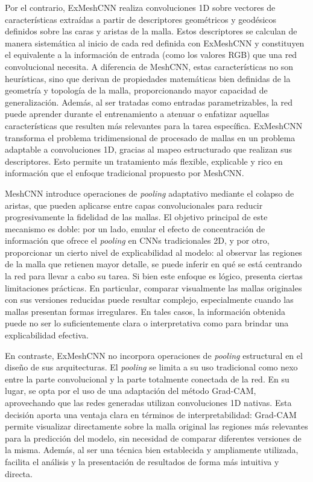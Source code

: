 Por el contrario, ExMeshCNN realiza convoluciones 1D sobre vectores de características extraídas a partir de descriptores geométricos y geodésicos definidos sobre las caras y aristas de la malla. Estos descriptores se calculan de manera sistemática al inicio de cada red definida con ExMeshCNN y constituyen el equivalente a la información de entrada (como los valores RGB) que una red convolucional necesita. A diferencia de MeshCNN, estas características no son heurísticas, sino que derivan de propiedades matemáticas bien definidas de la geometría y topología de la malla, proporcionando mayor capacidad de generalización. Además, al ser tratadas como entradas parametrizables, la red puede aprender durante el entrenamiento a atenuar o enfatizar aquellas características que resulten más relevantes para la tarea específica. ExMeshCNN transforma el problema tridimensional de procesado de mallas en un problema adaptable a convoluciones 1D, gracias al mapeo estructurado que realizan sus descriptores. Esto permite un tratamiento más flexible, explicable y rico en información que el enfoque tradicional propuesto por MeshCNN.

MeshCNN introduce operaciones de \textit{pooling} adaptativo mediante el colapso de aristas, que pueden aplicarse entre capas convolucionales para reducir progresivamente la fidelidad de las mallas. El objetivo principal de este mecanismo es doble: por un lado, emular el efecto de concentración de información que ofrece el \textit{pooling} en CNNs tradicionales 2D, y por otro, proporcionar un cierto nivel de explicabilidad al modelo: al observar las regiones de la malla que retienen mayor detalle, se puede inferir en qué se está centrando la red para llevar a cabo su tarea. Si bien este enfoque es lógico, presenta ciertas limitaciones prácticas. En particular, comparar visualmente las mallas originales con sus versiones reducidas puede resultar complejo, especialmente cuando las mallas presentan formas irregulares. En tales casos, la información obtenida puede no ser lo suficientemente clara o interpretativa como para brindar una explicabilidad efectiva.

En contraste, ExMeshCNN no incorpora operaciones de \textit{pooling} estructural en el diseño de sus arquitecturas. El \textit{pooling} se limita a su uso tradicional como nexo entre la parte convolucional y la parte totalmente conectada de la red. En su lugar, se opta por el uso de una adaptación del método Grad-CAM, aprovechando que las redes generadas utilizan convoluciones 1D nativas. Esta decisión aporta una ventaja clara en términos de interpretabilidad: Grad-CAM permite visualizar directamente sobre la malla original las regiones más relevantes para la predicción del modelo, sin necesidad de comparar diferentes versiones de la misma. Además, al ser una técnica bien establecida y ampliamente utilizada, facilita el análisis y la presentación de resultados de forma más intuitiva y directa.

